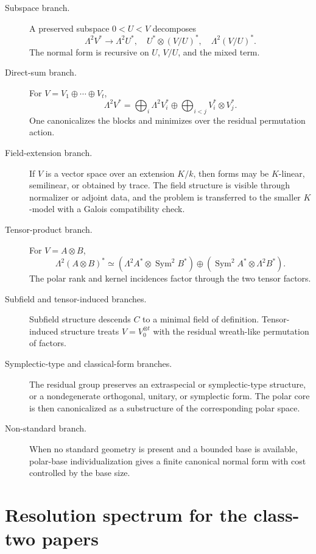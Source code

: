 \documentclass[11pt]{article}
\begin{document}
\begin{description}
\item[Subspace branch.]
A preserved subspace $0<U<V$ decomposes
\[
\Lambda^2V^*
\to
\Lambda^2U^*,\quad
U^*\otimes(V/U)^*,\quad
\Lambda^2(V/U)^*.
\]
The normal form is recursive on $U$, $V/U$, and the mixed term.

\item[Direct-sum branch.]
For $V=V_1\oplus\cdots\oplus V_t$,
\[
\Lambda^2V^*
=
\bigoplus_i\Lambda^2V_i^*
\oplus
\bigoplus_{i<j}V_i^*\otimes V_j^*.
\]
One canonicalizes the blocks and minimizes over the residual permutation action.

\item[Field-extension branch.]
If $V$ is a vector space over an extension $K/k$, then forms may be $K$-linear, semilinear, or obtained by trace. The field structure is visible through normalizer or adjoint data, and the problem is transferred to the smaller $K$-model with a Galois compatibility check.

\item[Tensor-product branch.]
For $V=A\otimes B$,
\[
\Lambda^2(A\otimes B)^*
\simeq
(\Lambda^2A^*\otimes\operatorname{Sym}^2B^*)
\oplus
(\operatorname{Sym}^2A^*\otimes\Lambda^2B^*).
\]
The polar rank and kernel incidences factor through the two tensor factors.

\item[Subfield and tensor-induced branches.]
Subfield structure descends $C$ to a minimal field of definition. Tensor-induced structure treats $V=V_0^{\otimes t}$ with the residual wreath-like permutation of factors.

\item[Symplectic-type and classical-form branches.]
The residual group preserves an extraspecial or symplectic-type structure, or a nondegenerate orthogonal, unitary, or symplectic form. The polar core is then canonicalized as a substructure of the corresponding polar space.

\item[Non-standard branch.]
When no standard geometry is present and a bounded base is available, polar-base individualization gives a finite canonical normal form with cost controlled by the base size.
\end{description}

\section{Resolution spectrum for the class-two papers}
\end{document}
